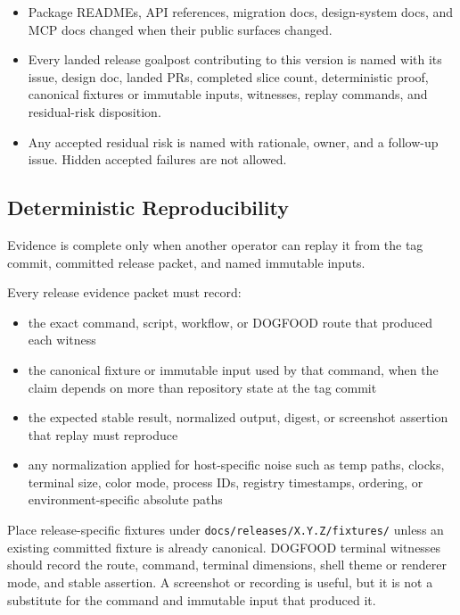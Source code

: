 \begin{itemize}
\item
  Package READMEs, API references, migration docs, design-system docs, and MCP docs changed when their public surfaces changed.
\item
  Every landed release goalpost contributing to this version is named with its issue, design doc, landed PRs, completed slice count, deterministic proof, canonical fixtures or immutable inputs, witnesses, replay commands, and residual-risk disposition.
\item
  Any accepted residual risk is named with rationale, owner, and a follow-up issue. Hidden accepted failures are not allowed.
\end{itemize}

\subsection{Deterministic Reproducibility}\label{record-274-deterministic-reproducibility}

Evidence is complete only when another operator can replay it from the tag commit, committed release packet, and named immutable inputs.

Every release evidence packet must record:

\begin{itemize}
\tightlist
\item
  the exact command, script, workflow, or DOGFOOD route that produced each witness
\item
  the canonical fixture or immutable input used by that command, when the claim depends on more than repository state at the tag commit
\item
  the expected stable result, normalized output, digest, or screenshot assertion that replay must reproduce
\item
  any normalization applied for host-specific noise such as temp paths, clocks, terminal size, color mode, process IDs, registry timestamps, ordering, or environment-specific absolute paths
\end{itemize}

Place release-specific fixtures under \texttt{d\allowbreak{}o\allowbreak{}c\allowbreak{}s\allowbreak{}/\allowbreak{}r\allowbreak{}e\allowbreak{}l\allowbreak{}e\allowbreak{}a\allowbreak{}s\allowbreak{}e\allowbreak{}s\allowbreak{}/\allowbreak{}X\allowbreak{}.\allowbreak{}Y\allowbreak{}.\allowbreak{}Z\allowbreak{}/\allowbreak{}f\allowbreak{}i\allowbreak{}x\allowbreak{}t\allowbreak{}u\allowbreak{}r\allowbreak{}e\allowbreak{}s\allowbreak{}/} unless an existing committed fixture is already canonical. DOGFOOD terminal witnesses should record the route, command, terminal dimensions, shell theme or renderer mode, and stable assertion. A screenshot or recording is useful, but it is not a substitute for the command and immutable input that produced it.

